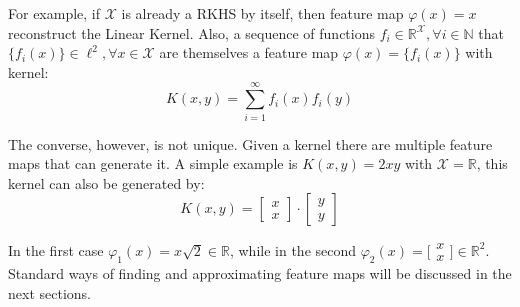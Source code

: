 For example, if $\mathcal{X}$ is already a RKHS by itself, then feature
map $\varphi(x)=x$ reconstruct the Linear Kernel. Also, a sequence of functions
$f_i \in \mathbb{R}^\mathcal{X}, \forall i \in \mathbb{N}$ that $\{f_i(x)\}
\in \ell^2, \forall x \in \mathcal{X}$ are themselves a feature map
$\varphi(x)=\{f_i(x)\}$ with kernel:
\begin{equation*}
K(x,y) = \sum_{i=1}^\infty f_i(x) f_i(y)
\end{equation*}

The converse, however, is not unique. Given a kernel there are multiple feature
maps that can generate it. A simple example is $K(x,y)=2xy$ with
$\mathcal{X}=\mathbb{R}$, this kernel can also be generated by:
\begin{equation*}
K(x,y) = \begin{bmatrix}x \\ x\end{bmatrix}\cdot\begin{bmatrix}y \\
y\end{bmatrix}
\end{equation*}

In the first case $\varphi_1(x)=x {\scriptstyle\sqrt{2}} \in \mathbb{R}$, while
in the second $\varphi_2(x)=\bigl[\begin{smallmatrix}x \\
x\end{smallmatrix}\bigr] \in \mathbb{R}^2$. Standard ways of finding and
approximating feature maps will be discussed in the next sections.